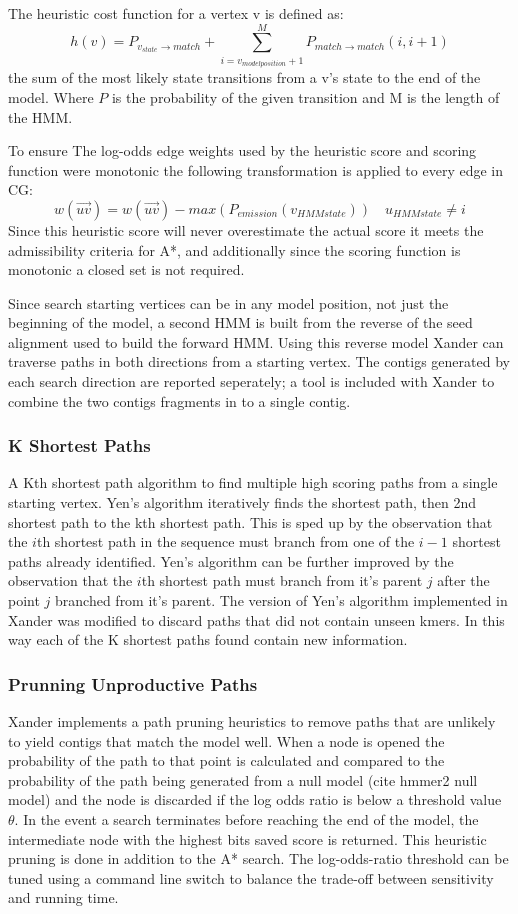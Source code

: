 \documentclass[10pt]{bmc_article}
\newenvironment{bmcformat}{\begin{raggedright}\baselineskip20pt\sloppy\setboolean{publ}{false}}{\end{raggedright}\baselineskip20pt\sloppy}
\begin{document}
\begin{bmcformat}
The heuristic cost function for a vertex v is defined as:
\[h(v) = P_{v_{state}\rightarrow match} + \sum_{i=v_{model position} + 1}^{M}P_{match\rightarrow match}(i, i + 1)\]
the sum of the most likely state transitions from a v's state to the end of the model. Where $P$ is the probability of the given transition and M is the length of the HMM.

To ensure The log-odds edge weights used by the heuristic score and scoring function were monotonic the following transformation is applied to every edge in CG:
\[ w(\overrightarrow{uv}) = w(\overrightarrow{uv}) - max(P_{emission}(v_{HMM state})) \quad u_{HMM state} \ne i\]
Since this heuristic score will never overestimate the actual score it meets the admissibility criteria for A*, and additionally since the scoring function is monotonic a closed set is not required.

Since search starting vertices can be in any model position, not just the beginning of the model, a second HMM is built from the reverse of the seed alignment used to build the forward HMM.  Using this reverse model Xander can traverse paths in both directions from a starting vertex.  The contigs generated by each search direction are reported seperately; a tool is included with Xander to combine the two contigs fragments in to a single contig.

\subsubsection*{K Shortest Paths}
A Kth shortest path algorithm\cite{yen_finding_1971} to find multiple high scoring paths from a single starting vertex.  Yen's algorithm iteratively finds the shortest path, then 2nd shortest path to the kth shortest path.  This is sped up by the observation that the $i$th shortest path in the sequence must branch from one of the $i-1$ shortest paths already identified.  Yen's algorithm can be further improved by the observation that the $i$th shortest path must branch from it's parent $j$ after the point $j$ branched from it's parent\cite{lawler_procedure_1972}.  The version of Yen's algorithm implemented in Xander was modified to discard paths that did not contain unseen kmers.  In this way each of the K shortest paths found contain new information.

\subsubsection*{Prunning Unproductive Paths}
Xander implements a path pruning heuristics to remove paths that are unlikely to yield contigs that match the model well.  When a node is opened the probability of the path to that point is calculated and compared to the probability of the path being generated from a null model (cite hmmer2 null model) and the node is discarded if the log odds ratio is below a threshold value $\theta$. In the event a search terminates before reaching the end of the model, the intermediate node with the highest bits saved score is returned.  This heuristic pruning is done in addition to the A* search. The log-odds-ratio threshold can be tuned using a command line switch to balance the trade-off between sensitivity and running time.


\end{bmcformat}
\end{document}
